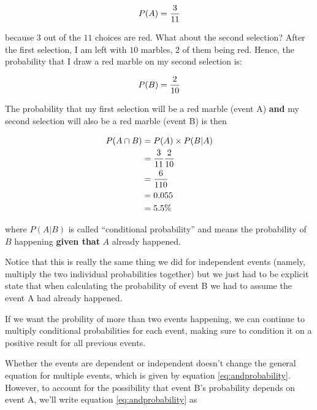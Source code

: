 \begin{equation}
P(A) = {3\over 11}  \nonumber
\end{equation}


because $3$ out of the $11$ choices are red.  What about the second
selection?  After the first selection, I am left with $10$ marbles,
$2$ of them being red.  Hence, the probability that I draw a red
marble on my second selection is:

\begin{equation}
 P(B) = {2\over 10}\nonumber
\end{equation}

The probability that my first selection will be a red marble (event A)
\textbf{and} my second selection will also be a red marble (event B)
is then

\begin{align}
  P(A \cap B) &= P(A) \times P(B|A)\nonumber\\
              &= {3\over 11} {2\over 10}\nonumber\\
              &= {6 \over 110}\nonumber\\
              &= 0.055 \nonumber\\
              &= 5.5\%\nonumber
\end{align}

where $P(A|B)$ is called ``conditional probability'' and means the
probability of $B$ happening \textbf{given that} $A$ already happened.

Notice that this is really the same thing we did for independent
events (namely, multiply the two individual probabilities together)
but we just had to be explicit state that when calculating the
probability of event B we had to assume the event A had already happened.

If we want the probility of more than two events happening, we can
continue to multiply conditional probabilities for each event, making
sure to condition it on a positive result for all previous events.

Whether the events are dependent or independent doesn't change the
general equation for multiple events, which is given by equation
\eqref{eq:andprobability}.  However, to account for the possibility
that event B's probability depends on event A, we'll write equation
\eqref{eq:andprobability} as

